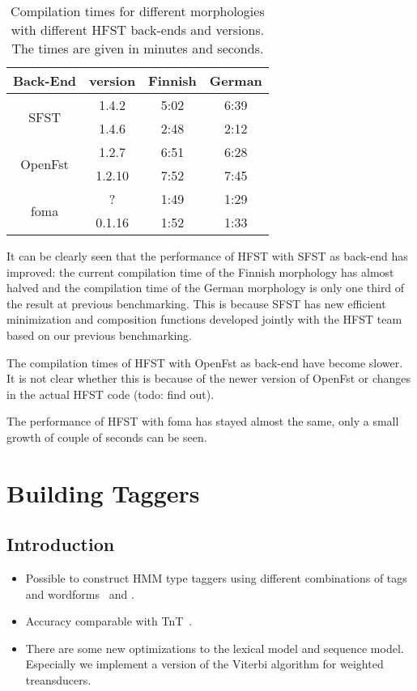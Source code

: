 \documentclass{llncs}
\begin{document}
\begin{table} [h!]
\centering
  \begin{tabular}{| c | c | c | c |}
  \hline
  Back-End                 & version  & Finnish  & German \\ \hline\hline
  \multirow{2}{*}{SFST}    & 1.4.2    & 5:02     & 6:39 \\
                           & 1.4.6    & 2:48     & 2:12 \\ \hline
  \multirow{2}{*}{OpenFst} & 1.2.7    & 6:51     & 6:28 \\
                           & 1.2.10   & 7:52     & 7:45 \\ \hline
  \multirow{2}{*}{foma}    & ?        & 1:49     & 1:29 \\
                           & 0.1.16   & 1:52     & 1:33 \\
\hline
  \end{tabular}
  \caption{Compilation times for different morphologies with
    different HFST back-ends and versions. 
    The times are given in minutes and seconds.}
  \label{tab:compilation_times_versions}
\end{table}

It can be clearly seen that the performance of HFST with SFST as back-end 
has improved: the current compilation time of the Finnish morphology has almost
halved and the compilation time of the German morphology is only one third of the
result at previous benchmarking. 
This is because SFST has new efficient minimization and composition functions
developed jointly with the HFST team based on our previous benchmarking.

The compilation times of HFST with OpenFst as back-end have become slower. It is not
clear whether this is because of the newer version of OpenFst or changes in the 
actual HFST code (todo: find out).

The performance of HFST with foma has stayed almost the same, only a small
growth of couple of seconds can be seen. 
 

\section{Building Taggers}

\subsection{Introduction}

\begin{itemize}
\item Possible to construct HMM type taggers using different
  combinations of tags and wordforms~\cite{Silfverberg/2010/IceTal}
  and \cite{Silfverberg/2011}.
\item Accuracy comparable with TnT~\cite{Brants:2000}.
\item There are some new optimizations to the lexical model and
  sequence model. Especially we implement a version of the Viterbi
  algorithm for weighted treansducers.
\end{itemize}
\end{document}

